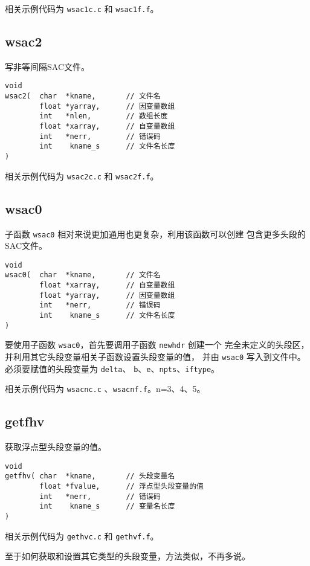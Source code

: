 相关示例代码为 \texttt{wsac1c.c} 和 \texttt{wsac1f.f}。

\subsection{wsac2}
写非等间隔SAC文件。

\begin{verbatim}
void
wsac2(  char  *kname,       // 文件名
        float *yarray,      // 因变量数组
        int   *nlen,        // 数组长度
        float *xarray,      // 自变量数组
        int   *nerr,        // 错误码
        int    kname_s      // 文件名长度
)
\end{verbatim}

相关示例代码为 \texttt{wsac2c.c} 和 \texttt{wsac2f.f}。

\subsection{wsac0}
子函数 \texttt{wsac0} 相对来说更加通用也更复杂，利用该函数可以创建
包含更多头段的SAC文件。

\begin{verbatim}
void
wsac0(  char  *kname,       // 文件名
        float *xarray,      // 自变量数组
        float *yarray,      // 因变量数组
        int   *nerr,        // 错误码
        int    kname_s      // 文件名长度
)
\end{verbatim}

要使用子函数 \texttt{wsac0}，首先要调用子函数 \texttt{newhdr} 创建一个
完全未定义的头段区，并利用其它头段变量相关子函数设置头段变量的值，
并由 \texttt{wsac0} 写入到文件中。必须要赋值的头段变量为 \texttt{delta}、
\texttt{b}、\texttt{e}、\texttt{npts}、\texttt{iftype}。

相关示例代码为 \texttt{wsacnc.c} 、\texttt{wsacnf.f}。n=3、4、5。

\subsection{getfhv}
获取浮点型头段变量的值。
\begin{verbatim}
void
getfhv( char  *kname,       // 头段变量名
        float *fvalue,      // 浮点型头段变量的值
        int   *nerr,        // 错误码
        int    kname_s      // 变量名长度
)
\end{verbatim}

相关示例代码为 \texttt{gethvc.c} 和 \texttt{gethvf.f}。

至于如何获取和设置其它类型的头段变量，方法类似，不再多说。

